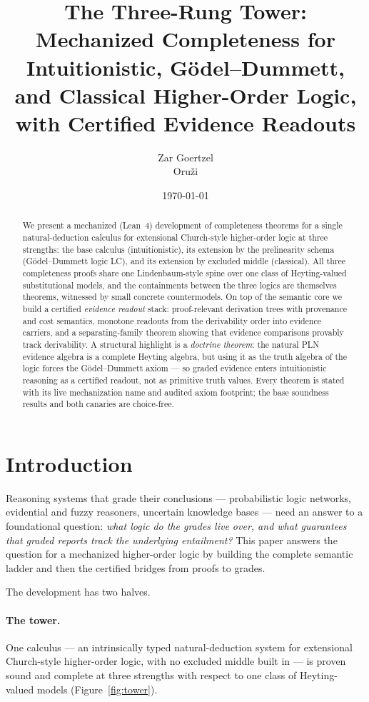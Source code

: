 \documentclass[11pt]{article}
\title{The Three-Rung Tower:\\
\large Mechanized Completeness for Intuitionistic, G\"odel--Dummett, and
Classical Higher-Order Logic,\\ with Certified Evidence Readouts}
\author{Zar Goertzel\\Oru\v{z}i}
\date{\today}
\theoremstyle{plain}
\theoremstyle{definition}
\begin{document}
\maketitle

\begin{abstract}
We present a mechanized (Lean~4) development of completeness theorems for a
single natural-deduction calculus for extensional Church-style higher-order
logic at three strengths: the base calculus (intuitionistic), its extension by
the prelinearity schema (G\"odel--Dummett logic LC), and its extension by
excluded middle (classical).  All three completeness proofs share one
Lindenbaum-style spine over one class of Heyting-valued substitutional models,
and the containments between the three logics are themselves theorems,
witnessed by small concrete countermodels.  On top of the semantic core we
build a certified \emph{evidence readout} stack: proof-relevant derivation
trees with provenance and cost semantics, monotone readouts from the
derivability order into evidence carriers, and a separating-family theorem
showing that evidence comparisons provably track derivability.  A structural
highlight is a \emph{doctrine theorem}: the natural PLN evidence algebra is a
complete Heyting algebra, but using it as the truth algebra of the logic
forces the G\"odel--Dummett axiom --- so graded evidence enters intuitionistic
reasoning as a certified readout, not as primitive truth values.  Every
theorem is stated with its live mechanization name and audited axiom
footprint; the base soundness results and both canaries are choice-free.
\end{abstract}

\section{Introduction}

Reasoning systems that grade their conclusions --- probabilistic logic
networks, evidential and fuzzy reasoners, uncertain knowledge bases --- need
an answer to a foundational question: \emph{what logic do the grades live
over, and what guarantees that graded reports track the underlying
entailment?}  This paper answers the question for a mechanized higher-order
logic by building the complete semantic ladder and then the certified bridges
from proofs to grades.

The development has two halves.

\paragraph{The tower.}  One calculus --- an intrinsically typed
natural-deduction system for extensional Church-style higher-order logic,
with no excluded middle built in --- is proven sound and complete at three
strengths with respect to one class of Heyting-valued models
(Figure~\ref{fig:tower}).
\end{document}
